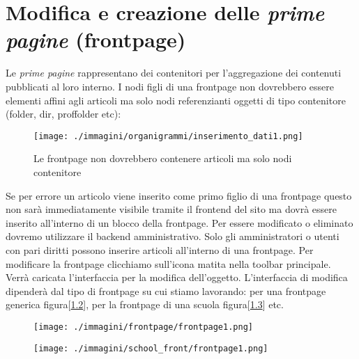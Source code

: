 \chapter[Pagina principale]{Modifica e creazione delle \textsl{prime pagine} (frontpage)}

Le \textsl{prime pagine} rappresentano dei contenitori per l'aggregazione dei contenuti pubblicati al loro interno. I nodi figli di una frontpage non dovrebbero essere elementi affini agli articoli ma solo nodi referenzianti oggetti di tipo contenitore (folder, dir, proffolder etc):
 \begin{figure}[h]
 \centering
 \texttt{[image: ./immagini/organigrammi/inserimento\_dati1.png]}
 \caption{Le frontpage non dovrebbero contenere articoli ma solo nodi contenitore}
 \label{fig:child_frontpage}
\end{figure}

Se per errore un articolo viene inserito come primo figlio di una frontpage questo non sarà immediatamente visibile tramite il frontend del sito ma dovrà essere inserito all'interno di un blocco della frontpage. Per essere modificato o eliminato dovremo utilizzare il backend amministrativo. Solo gli amministratori o utenti con pari diritti possono inserire articoli all'interno di una frontpage.
Per modificare la frontpage clicchiamo sull'icona matita nella toolbar principale. Verrà caricata l'interfaccia per la modifica dell'oggetto. L'interfaccia di modifica dipenderà dal tipo di frontpage su cui stiamo lavorando: per una frontpage generica figura[\ref{fig:frontpage_generica}], per la frontpage di una scuola figura[\ref{fig:frontpage_scuola}] etc.
\begin{figure}[H]
 \centering
 \texttt{[image: ./immagini/frontpage/frontpage1.png]}
 \label{fig:frontpage_generica}
\end{figure}

\begin{figure}[H]
 \centering
 \texttt{[image: ./immagini/school\_front/frontpage1.png]}
 \label{fig:frontpage_scuola}
\end{figure}


